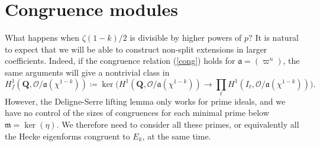 \documentclass[11pt]{amsart}
\newcommand{\Q}{\mathbf{Q}}  %
\newcommand{\ir}{\mathcal{O}} %
\theoremstyle{definition}
\theoremstyle{definition}
\theoremstyle{definition}
\theoremstyle{definition}
\theoremstyle{definition}
\theoremstyle{definition}
\begin{document}
\section{Congruence modules}
What happens when $\zeta(1-k)/2$ is divisible by higher powers of $p$?
It is natural to expect that we will be able to construct non-split extensions in larger coefficients.
Indeed, if the congruence relation (\ref{cong}) holds for $\mathfrak{a}=(\varpi^n)$,
the same arguments will give a nontrivial class in
\begin{equation*}
    H^1_f(\Q, \ir/\mathfrak{a}(\chi^{1-k}))\coloneqq
    \ker\bigg(
    H^1(\Q,\ir/\mathfrak{a}(\chi^{1-k}))\to\prod_{\ell}
    H^1(I_\ell,\ir/\mathfrak{a}(\chi^{1-k}))
    \bigg).
\end{equation*}
However, the Deligne-Serre lifting lemma only works for prime ideals,
and we have no control of the sizes of congruences for each minimal prime below $\mathfrak{m}=\ker(\eta)$.
We therefore need to consider all these primes, or equivalently
all the Hecke eigenforms congruent to $E_k$, at the same time.
\end{document}
